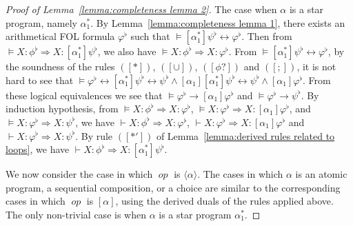 \documentclass[manuscript,screen]{acmart}
\newcommand{\la}[0]{\langle}
\newcommand{\ra}[0]{\rangle}
\DeclareMathOperator{\seq}{;}
\newcommand{\lup}[0]{*}
\DeclareMathOperator{\op}{\mathit{op}}
\begin{document}
\begin{proof}[Proof of Lemma~\ref{lemma:completeness lemma 2}]
    The case when $\alpha$ is a star program, namely $\alpha^\lup_1$.
    By Lemma~\ref{lemma:completeness lemma 1}, there exists an arithmetical FOL formula $\varphi^\flat$ such that $\models [\alpha^\lup_1]\psi^\flat\leftrightarrow \varphi^\flat$. 
    Then from $\models X : \phi^\flat\Rightarrow X : [\alpha^\lup_1]\psi^\flat$, we also have $\models X : \phi^\flat \Rightarrow X : \varphi^\flat$. 
    From $\models [\alpha^\lup_1]\psi^\flat\leftrightarrow \varphi^\flat$, by the soundness of the rules $([\lup])$, $([\cup])$, $([\phi?])$ and $([\seq])$, it is not hard to see that 
    $\models \varphi^\flat\leftrightarrow [\alpha^\lup_1]\psi^\flat\leftrightarrow \psi^\flat\wedge [\alpha_1][\alpha^\lup_1]\psi^\flat\leftrightarrow \psi^\flat\wedge [\alpha_1]\varphi^\flat$. 
    From these logical equivalences we see that $\models \varphi^\flat \to [\alpha_1]\varphi^\flat$ and $\models\varphi^\flat\to \psi^\flat$. 
    By induction hypothesis, from $\models X : \phi^\flat\Rightarrow  X : \varphi^\flat$, $\models X : \varphi^\flat\Rightarrow X : [\alpha_1]\varphi^\flat$, 
    and $\models X : \varphi^\flat\Rightarrow X : \psi^\flat$, 
    we have 
    $\vdash X : \phi^\flat\Rightarrow X : \varphi^\flat$, 
    $\vdash X : \varphi^\flat\Rightarrow X : [\alpha_1]\varphi^\flat$ and 
    $\vdash X : \varphi^\flat\Rightarrow X : \psi^\flat$. 
    By rule $([\lup'])$ of Lemma~\ref{lemma:derived rules related to loops}, we have 
    $\vdash X : \phi^\flat\Rightarrow X : [\alpha^\lup_1]\psi^\flat$. 

We now consider the case in which $\op$ is $\la\alpha\ra$. The cases in which $\alpha$ is an atomic program, a sequential composition, or a choice are similar to the corresponding cases in which $\op$ is $[\alpha]$, using the derived duals of the rules applied above. 
    The only non-trivial case is when $\alpha$ is a star program $\alpha^\lup_1$. 


\end{proof}
\end{document}
